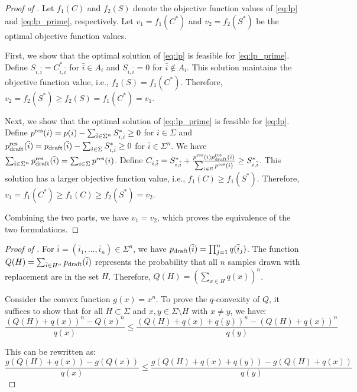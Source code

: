 \documentclass{article}
\begin{document}
\begin{proof}[Proof of ]\label{pr:eq_lp_lp_prime}
Let $f_1(C)$ and $f_2(S)$ denote the objective function values of \eqref{eq:lp} and \eqref{eq:lp_prime}, respectively. Let $v_1=f_1(C^\ast)$ and $v_2=f_2(S^\ast)$ be the optimal objective function values.

First, we show that the optimal solution of \eqref{eq:lp} is feasible for \eqref{eq:lp_prime}. Define $S_{i,\bar{i}}=C^\ast_{i,\bar{i}}$ for $\bar{i}\in A_i$ and $S_{i,\bar{i}}=0$ for $\bar{i}\notin A_i$. This solution maintains the objective function value, i.e., $f_2(S)=f_1(C^\ast)$. Therefore, $v_2=f_2(S^\ast)\geq f_2(S)=f_1(C^\ast)=v_1$.

Next, we show that the optimal solution of \eqref{eq:lp_prime} is feasible for \eqref{eq:lp}. Define $p^{\operatorname{res}}(i)=p(i)-\sum_{\bar{i}\in\Sigma^n}S^\ast_{i,\bar{i}}\geq 0$ for $i\in\Sigma$ and $p_{\operatorname{draft}}^{\operatorname{res}}(\bar{i})=p_{\operatorname{draft}}(\bar{i})-\sum_{i\in\Sigma}S^\ast_{i,\bar{i}}\geq 0$ for $\bar{i}\in\Sigma^n$. We have $\sum_{\bar{i}\in\Sigma^n}p_{\operatorname{draft}}^{\operatorname{res}}(\bar{i})=\sum_{i\in\Sigma}p^{\operatorname{res}}(i)$. Define $C_{i,\bar{i}}=S^\ast_{i,\bar{i}}+\frac{p^{\operatorname{res}}(i)p_{\operatorname{draft}}^{\operatorname{res}}(\bar{i})}{\sum_{i\in\Sigma}p^{\operatorname{res}}(i)}\geq S^\ast_{i,\bar{i}}$. This solution has a larger objective function value, i.e., $f_1(C)\geq f_1(S^\ast)$. Therefore, $v_1=f_1(C^\ast)\geq f_1(C)\geq f_2(S^\ast)=v_2$.

Combining the two parts, we have $v_1=v_2$, which proves the equivalence of the two formulations.
\end{proof} \begin{proof}[Proof of ]
For $\bar{i}=(\bar{i}_1,\dots,\bar{i}_n)\in\Sigma^n$, we have $p_{\operatorname{draft}}(\bar{i})=\prod_{j=1}^n q(\bar{i}_j)$. The function $Q(H)=\sum_{\bar{i}\in H^n} p_{\operatorname{draft}}(\bar{i})$ represents the probability that all $n$ samples drawn with replacement are in the set $H$. Therefore, $Q(H)=(\sum_{x\in H} q(x))^n$.

Consider the convex function $g(x)=x^n$. To prove the $q$-convexity of $Q$, it suffices to show that for all $H\subset \Sigma$ and $x,y\in \Sigma\setminus H$ with $x\neq y$, we have:
\begin{equation}
\frac{(Q(H)+q(x))^n-Q(x)^n}{q(x)}\leq\frac{(Q(H)+q(x)+q(y))^n-(Q(H)+q(x))^n}{q(y)}
\end{equation}

This can be rewritten as:
\begin{equation}
\frac{g(Q(H)+q(x))-g(Q(x))}{q(x)}\leq\frac{g(Q(H)+q(x)+q(y))-g(Q(H)+q(x))}{q(y)}
\end{equation}


\end{proof}
\end{document}
